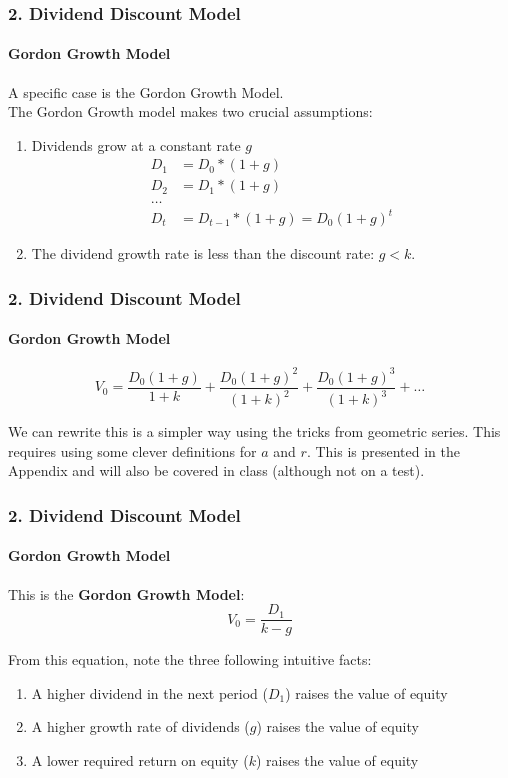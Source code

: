 \documentclass{beamer}
\begin{document}
\begin{frame}[t]
    \frametitle{2. Dividend Discount Model}
    \framesubtitle{Gordon Growth Model}

    A specific case is the Gordon Growth Model.\\
    \vspace{1em}
    The Gordon Growth model makes two crucial assumptions:\\
    \begin{enumerate}
        \item Dividends grow at a constant rate $g$ 
            \begin{align*}
    D_1 &= D_0 * (1+g)\\
    D_2 &= D_1 * (1+g)\\
    \ldots\\
    D_t &= D_{t-1} * (1+g) = D_0(1+g)^t
    \end{align*}
        \item The dividend growth rate is less than the discount rate: $g<k$.
    \end{enumerate}




\end{frame}

\begin{frame}[t]
    \frametitle{2. Dividend Discount Model}
    \framesubtitle{Gordon Growth Model}

    $$
    V_0 = \frac{D_0(1+g)}{1+k} + \frac{D_0(1+g)^2}{(1+k)^2} + \frac{D_0(1+g)^3}{(1+k)^3} + \ldots
    $$
    
    \vspace{3em}
    
    We can rewrite this is a simpler way using the tricks from geometric series.   
    This requires using some clever definitions for $a$ and $r$.  This is presented in the Appendix and will also be covered in class (although not on a test).\\
    \vspace{1em}


\end{frame}


\begin{frame}[t]
    \frametitle{2. Dividend Discount Model}
    \framesubtitle{Gordon Growth Model}

    This is the \textbf{Gordon Growth Model}:
    $$\boxed{V_0 = \frac{D_1}{k-g}}$$

    From this equation, note the three following intuitive facts:
    \begin{enumerate}
        \item A higher dividend in the next period ($D_1$) raises the value of equity
        \item A higher growth rate of dividends ($g$) raises the value of equity
        \item A lower required return on equity ($k$) raises the value of equity
    \end{enumerate}

\end{frame}
\end{document}
